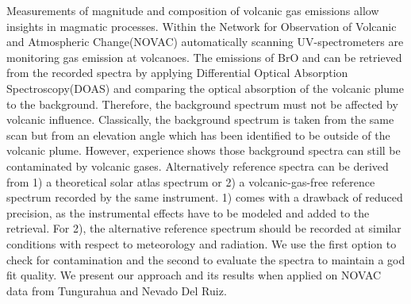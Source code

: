

Measurements of magnitude and composition of volcanic gas emissions allow insights in magmatic processes. Within the Network for Observation of Volcanic and Atmospheric Change(NOVAC) automatically scanning UV-spectrometers are monitoring gas emission at  volcanoes. The emissions of BrO and  can be retrieved from the recorded spectra by applying Differential Optical Absorption Spectroscopy(DOAS) and comparing the optical absorption of the volcanic plume to the background. Therefore, the background spectrum must not be affected by volcanic influence. Classically, the background spectrum is taken from the same scan but from an elevation angle which has been identified to be outside of the volcanic plume. However, experience shows those background spectra can still be contaminated by volcanic gases.  Alternatively reference spectra can be derived from 1) a theoretical solar atlas spectrum or 2) a volcanic-gas-free reference spectrum recorded by the same instrument. 1) comes with a drawback of reduced precision, as the instrumental effects have to be modeled and added to the retrieval. For 2), the alternative reference spectrum should be recorded at similar conditions with respect to meteorology and radiation. We use the first option to check for contamination and the second to evaluate the spectra to maintain a god fit quality. We present our approach and its results when applied on NOVAC data from Tungurahua and Nevado Del Ruiz.
